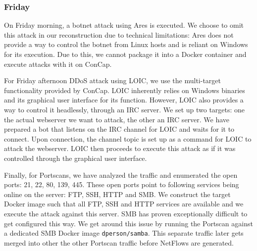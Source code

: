 \subsubsection{Friday}
On Friday morning, a botnet attack using Ares is executed. We choose to omit this attack in our reconstruction due to technical limitations: Ares does not provide a way to control the botnet from Linux hosts and is reliant on Windows for its execution. Due to this, we cannot package it into a Docker container and execute attacks with it on ConCap.

For Friday afternoon DDoS attack using LOIC, we use the multi-target functionality provided by ConCap. LOIC inherently relies on Windows binaries and its graphical user interface for its function. However, LOIC also provides a way to control it headlessly, through an IRC server. We set up two targets: one the actual webserver we want to attack, the other an IRC server. We have prepared a bot that listens on the IRC channel for LOIC and waits for it to connect. Upon connection, the channel topic is set up as a command for LOIC to attack the webserver. LOIC then proceeds to execute this attack as if it was controlled through the graphical user interface.

Finally, for Portscans, we have analyzed the traffic and enumerated the open ports: 21, 22, 80, 139, 445. These open ports point to following services being online on the server: FTP, SSH, HTTP and SMB. We construct the target Docker image such that all FTP, SSH and HTTP services are available and we execute the attack against this server. SMB has proven exceptionally difficult to get configured this way. We get around this issue by running the Portscan against a dedicated SMB Docker image \texttt{dperson/samba}. This separate traffic later gets merged into other the other Portscan traffic before NetFlows are generated.

